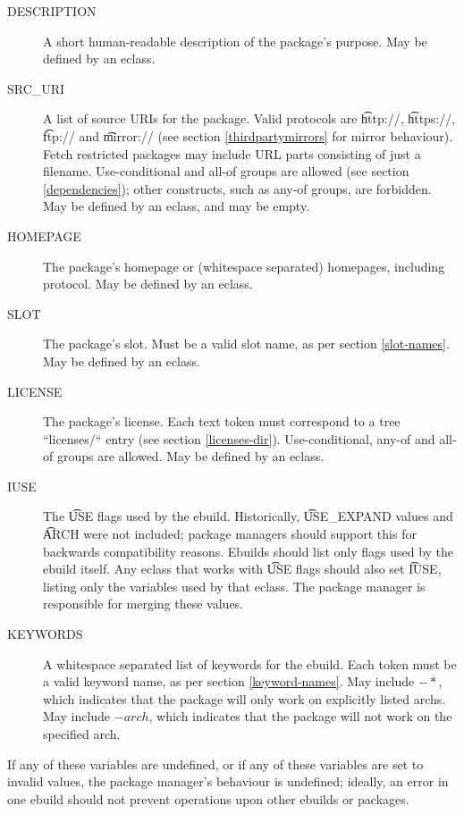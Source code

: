\begin{description}
\item[DESCRIPTION] A short human-readable description of the package's purpose. May be defined by an
    eclass.
\item[SRC\_URI] A list of source URIs for the package. Valid protocols are \t{http://},
    \t{https://}, \t{ftp://} and \t{mirror://} (see section \ref{thirdpartymirrors} for mirror behaviour).
    Fetch restricted packages may include URL parts consisting of just a filename.  Use-conditional and
    all-of groups are allowed (see section \ref{dependencies}); other constructs,
    such as any-of groups, are forbidden. May be defined by an eclass, and may be empty.
\item[HOMEPAGE] The package's homepage or (whitespace separated) homepages, including protocol. May
    be defined by an eclass.
\item[SLOT] The package's slot. Must be a valid slot name, as per section \ref{slot-names}. May
    be defined by an eclass.
\item[LICENSE] The package's license. Each text token must correspond to a tree ``licenses/`` entry
    (see section \ref{licenses-dir}). Use-conditional, any-of and all-of groups are allowed.
    May be defined by an eclass. \label{ebuild-var-LICENSE}
\item[IUSE] The \t{USE} flags used by the ebuild. Historically, \t{USE\_EXPAND} values and \t{ARCH}
    were not included; package managers should support this for backwards compatibility reasons. Ebuilds
    should list only flags used by the ebuild itself. Any eclass that works with \t{USE} flags
    should also set \t{IUSE}, listing only the variables used by that eclass. The package manager is
    responsible for merging these values.
\item[KEYWORDS] A whitespace separated list of keywords for the ebuild. Each token must be a
    valid keyword name, as per section \ref{keyword-names}. May include $-*$, which
    indicates that the package will only work on explicitly listed archs. May include $-arch$,
    which indicates that the package will not work on the specified arch.
\end{description}


If any of these variables are undefined, or if any of these variables are set to invalid values,
the package manager's behaviour is undefined; ideally, an error in one ebuild should not prevent
operations upon other ebuilds or packages.

